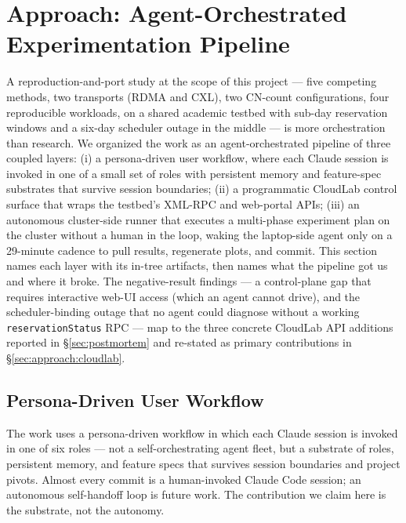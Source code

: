 \documentclass[11pt,a4paper]{article}
\begin{document}
\section{Approach: Agent-Orchestrated Experimentation Pipeline}
\label{sec:approach}

A reproduction-and-port study at the scope of this project --- five competing methods, two transports (RDMA and CXL), two CN-count configurations, four reproducible workloads, on a shared academic testbed with sub-day reservation windows and a six-day scheduler outage in the middle --- is more orchestration than research. We organized the work as an agent-orchestrated pipeline of three coupled layers: (i) a persona-driven user workflow, where each Claude session is invoked in one of a small set of roles with persistent memory and feature-spec substrates that survive session boundaries; (ii) a programmatic CloudLab control surface that wraps the testbed's XML-RPC and web-portal APIs; (iii) an autonomous cluster-side runner that executes a multi-phase experiment plan on the cluster without a human in the loop, waking the laptop-side agent only on a 29-minute cadence to pull results, regenerate plots, and commit. This section names each layer with its in-tree artifacts, then names what the pipeline got us and where it broke. The negative-result findings --- a control-plane gap that requires interactive web-UI access (which an agent cannot drive), and the scheduler-binding outage that no agent could diagnose without a working \texttt{reservationStatus} RPC --- map to the three concrete CloudLab API additions reported in §\ref{sec:postmortem} and re-stated as primary contributions in §\ref{sec:approach:cloudlab}.

\subsection{Persona-Driven User Workflow}
\label{sec:approach:fleet}

The work uses a persona-driven workflow in which each Claude session is invoked in one of six roles --- not a self-orchestrating agent fleet, but a substrate of roles, persistent memory, and feature specs that survives session boundaries and project pivots. Almost every commit is a human-invoked Claude Code session; an autonomous self-handoff loop is future work. The contribution we claim here is the substrate, not the autonomy.
\end{document}
